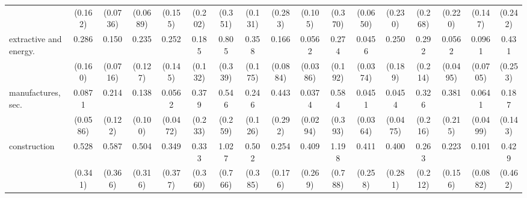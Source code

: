 {\begin{tabular}{l*{16}{c}}
                    &     (0.162)         &    (0.0736)         &    (0.0689)         &     (0.155)         &     (0.202)         &     (0.351)         &     (0.131)         &     (0.283)         &     (0.105)         &     (0.370)         &    (0.0650)         &     (0.230)         &     (0.268)         &     (0.220)         &     (0.147)         &     (0.242)         \\
[1em]
extractive and energy.&       0.286\sym{*}  &       0.150\sym{***}&       0.235\sym{**} &       0.252\sym{*}  &       0.185\sym{*}  &       0.805         &       0.358\sym{*}  &       0.166\sym{***}&      0.0562\sym{***}&       0.274         &      0.0456\sym{***}&       0.250         &       0.292         &      0.0562\sym{**} &      0.0961\sym{**} &       0.431         \\
                    &     (0.160)         &    (0.0716)         &     (0.127)         &     (0.145)         &     (0.132)         &     (0.339)         &     (0.175)         &    (0.0884)         &    (0.0386)         &     (0.192)         &    (0.0374)         &     (0.189)         &     (0.214)         &    (0.0495)         &    (0.0705)         &     (0.253)         \\
[1em]
manufactures, sec.  &      0.0871\sym{***}&       0.214\sym{**} &       0.138\sym{**} &      0.0562\sym{***}&       0.379         &       0.546         &       0.246\sym{**} &       0.443         &      0.0374\sym{***}&       0.584         &      0.0451\sym{***}&      0.0454\sym{**} &       0.326         &       0.381         &      0.0641\sym{***}&       0.187\sym{*}  \\
                    &    (0.0586)         &     (0.122)         &     (0.100)         &    (0.0472)         &     (0.233)         &     (0.259)         &     (0.126)         &     (0.292)         &    (0.0294)         &     (0.393)         &    (0.0364)         &    (0.0475)         &     (0.216)         &     (0.215)         &    (0.0499)         &     (0.143)         \\
[1em]
construction        &       0.528         &       0.587         &       0.504         &       0.349         &       0.333         &       1.027         &       0.502         &       0.254\sym{*}  &       0.409         &       1.198         &       0.411         &       0.400         &       0.263         &       0.223\sym{*}  &       0.101\sym{**} &       0.429         \\
                    &     (0.341)         &     (0.366)         &     (0.316)         &     (0.377)         &     (0.360)         &     (0.766)         &     (0.385)         &     (0.176)         &     (0.269)         &     (0.788)         &     (0.258)         &     (0.281)         &     (0.212)         &     (0.156)         &    (0.0882)         &     (0.462)         \\

\end{tabular}}
